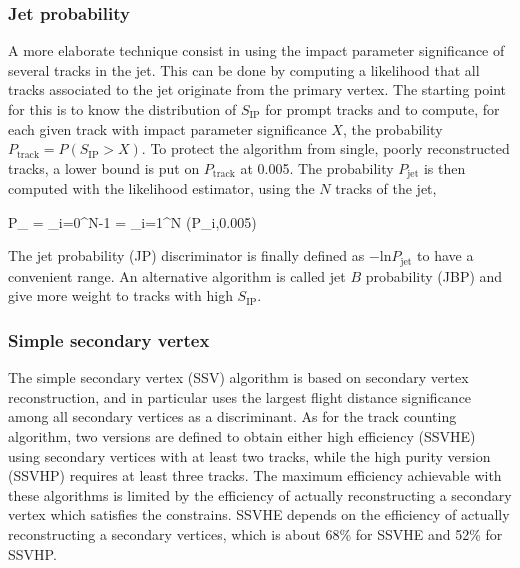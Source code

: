 
        \subsubsection{Jet probability}

    A more elaborate technique consist in using the impact parameter significance of
    several tracks in the jet. This can be done by computing a likelihood that all tracks
    associated to the jet originate from the primary vertex. The starting point for this
    is to know the distribution of $S_\text{IP}$ for prompt tracks and to compute, for
    each given track with impact parameter significance $X$, the probability $P_\text{track} =
    P(S_\text{IP} > X)$. To protect the algorithm from single, poorly reconstructed tracks,
    a lower bound is put on $P_\text{track}$ at 0.005. The probability $P_\text{jet}$ is
    then computed with the likelihood estimator, using the $N$ tracks of the jet,

    {
        P_ = \Pi \cdot \sum_{i=0}^{N-1}   \Pi = \prod_{i=1}^{N} (P_{i},0.005)
    }

    The jet probability (JP) discriminator is finally defined as $- \text{ln} P_\text{jet}$
    to have a convenient range. An alternative algorithm is called jet $B$ probability
    (JBP) and give more weight to tracks with high $S_\text{IP}$.


        \subsubsection{Simple secondary vertex}

    The simple secondary vertex (SSV) algorithm is based on secondary vertex reconstruction,
    and in particular uses the largest flight distance significance among all secondary
    vertices as a discriminant. As for the track counting algorithm, two versions are defined
    to obtain either high efficiency (SSVHE) using secondary vertices with at least two
    tracks, while the high purity version (SSVHP) requires at least three tracks. The
    maximum efficiency achievable with these algorithms is limited by the efficiency of
    actually reconstructing a secondary vertex which satisfies the constrains. SSVHE depends
    on the efficiency of actually reconstructing a secondary vertices, which is about 68\%
    for SSVHE and 52\% for SSVHP.

